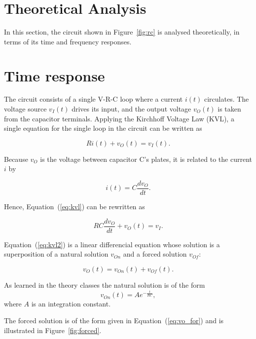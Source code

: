 \section{Theoretical Analysis}
\label{sec:analysis}

In this section, the circuit shown in Figure~\ref{fig:rc} is analysed theoretically, in terms of its time and frequency responses.

\section{Time response}

The circuit consists of a single V-R-C loop where a current $i(t)$ circulates. The voltage source $v_I(t)$ drives its input, and the output voltage $v_O(t)$ is taken from the capacitor terminals. Applying the Kirchhoff Voltage Law (KVL), a single equation for the single loop in the circuit can be written as

\begin{equation}
  Ri(t) + v_O(t) = v_I(t).
  \label{eq:kvl}
\end{equation}

Because $v_O$ is the voltage between capacitor C's plates, it is related to the current $i$ by

\begin{equation}
  i(t) = C\frac{dv_O}{dt}.
\end{equation}

Hence, Equation~(\ref{eq:kvl}) can be rewritten as

\begin{equation}
  RC\frac{dv_O}{dt} + v_O(t) = v_I.
  \label{eq:kvl2}
\end{equation}

Equation~(\ref{eq:kvl2}) is a linear differencial equation whose solution is a superposition of a natural solution $v_{On}$ and a forced solution $v_{Of}$:

\begin{equation}
  v_O(t) = v_{On}(t) + v_{Of}(t).
  \label{eq:vo_sol}
\end{equation}

As learned in the theory classes the natural solution is of the form
\begin{equation}
  v_{On}(t) = Ae^{-\frac{t}{RC}},
  \label{eq:vo_nat}
\end{equation}
where $A$ is an integration constant.

The forced solution is of the form given in Equation~(\ref{eq:vo_for}) and is illustrated in Figure~\ref{fig:forced}.


